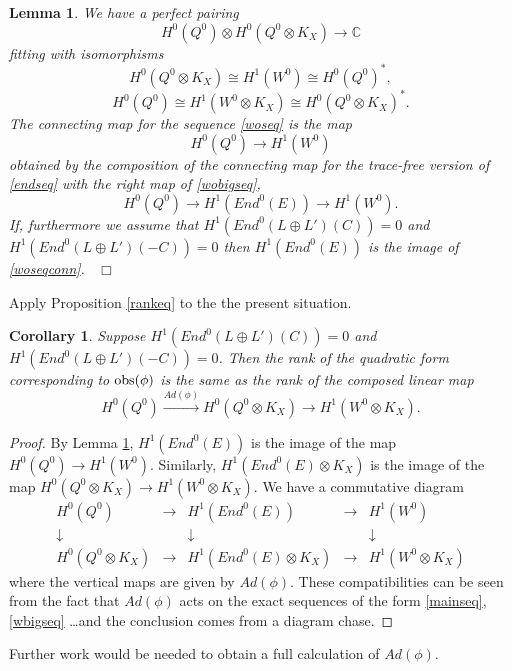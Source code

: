 \documentclass{amsart}
\theoremstyle{plain}
\newtheorem{lemma}[theorem]{Lemma}
\newtheorem{corollary}[theorem]{Corollary}
\numberwithin{equation}{section}
\begin{document}
\begin{lemma}
\label{defident}
We have a perfect pairing 
$$
H^0(Q^0)\otimes H^0(Q^0\otimes K_X) \rightarrow {{\mathbb C}}
$$
fitting with isomorphisms
$$
H^0(Q^0\otimes K_X)\cong H^1(W^0) \cong H^0(Q^0)^{\ast},
$$
$$
H^0(Q^0)\cong H^1(W^0\otimes K_X ) \cong H^0(Q^0\otimes K_X )^{\ast}.
$$
The connecting map for the sequence \eqref{woseq} is the map
\begin{equation}
\label{woseqconn}
H^0(Q^0)\rightarrow H^1(W^0)
\end{equation}
obtained by the composition of the connecting map for the trace-free version of 
\eqref{endseq} with the right map of \eqref{wobigseq},
$$
H^0(Q^0)\rightarrow H^1(End^0(E))\rightarrow H^1(W^0) .
$$
If, furthermore we assume that $H^1(End^0(L\oplus L')(C))= 0$ and 
$H^1(End^0(L\oplus L ')(-C))= 0$ then $H^1(End^0(E))$
is the image of \eqref{woseqconn}.
{\ \hfill $\Box$}
\end{lemma}

Apply Proposition \ref{rankeq} to the the present situation.

\begin{corollary}
Suppose $H^1(End^0(L\oplus L')(C))= 0$ and 
$H^1(End^0(L\oplus L ')(-C))= 0$. Then the rank of the 
quadratic form corresponding to ${{\rm obs}} (\phi )$ is the same as the rank of the
composed linear map 
$$
H^0(Q^0)\stackrel{Ad(\phi )}{\rightarrow} H^0(Q^0\otimes K_X)
\rightarrow H^1(W^0\otimes K_X) .
$$
\end{corollary}
\begin{proof}
By Lemma \ref{defident}, $H^1(End^0(E))$ is the image of the map 
$H^0(Q^0)\rightarrow H^1(W^0)$. Similarly, 
$H^1(End^0(E)\otimes K_X)$ is the image of the map 
$H^0(Q^0\otimes K_X)\rightarrow H^1(W^0\otimes K_X)$.
We have a commutative diagram 
$$
\begin{array}{ccccc}
H^0(Q^0) & \rightarrow & H^1(End^0(E)) & \rightarrow & H^1(W^0) \\
\downarrow & & \downarrow && \downarrow \\
H^0(Q^0\otimes K_X) & \rightarrow & H^1(End^0(E)\otimes K_X) & \rightarrow & H^1(W^0\otimes K_X)
\end{array}
$$
where the vertical maps are given by $Ad(\phi )$. These compatibilities can
be seen from the fact that $Ad(\phi )$ acts on the exact sequences of the form
\eqref{mainseq}, \eqref{wbigseq} \ldots and the conclusion comes from a diagram chase.
\end{proof}

Further work would be needed to obtain a full calculation of $Ad(\phi )$. 
\end{document}

